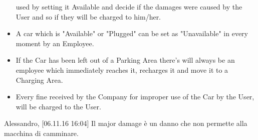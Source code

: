 \begin{itemize}
   used by setting it Available and decide if the damages were caused by the User and so if they will be charged to him/her. 
	\item A car which is "Available" or "Plugged" can be set as "Unavailable" in every moment by an Employee. 
	\item If the Car has been left out of a Parking Area there's will always be an employee which immediately reaches it, recharges it and move   
  it to a Charging Area. 
	\item 	Every fine received by the Company for improper use of the Car by the User, will be charged to the User.
\end{itemize}

Alessandro, [06.11.16 16:04]
Il major damage è un danno che non permette alla macchina di camminare.

